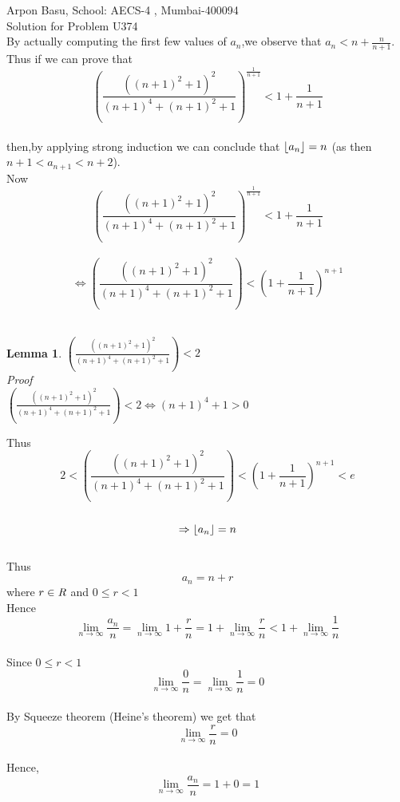 \documentclass[10pt,a4paper]{extarticle}
\DeclarePairedDelimiter\floor{\lfloor}{\rfloor}
\newtheorem{lemma}[theorem]{Lemma}
\begin{document}
Arpon Basu, School: AECS-4 , Mumbai-400094\\
%
Solution for Problem U374 \\
%
By actually computing the first few values of $a_{n}$,we observe that $a_{n}<n+\frac{n}{n+1}$.\\
Thus if we can prove that \\
$$(\frac{((n+1)^{2}+1)^{2}}{(n+1)^{4}+(n+1)^{2}+1})^{\frac{1}{n+1}}<1+\frac{1}{n+1}$$\\
then,by applying strong induction we can conclude that $\floor*{a_{n}}=n$ (as then $n+1<a_{n+1}<n+2$).\\
Now \\
$$(\frac{((n+1)^{2}+1)^{2}}{(n+1)^{4}+(n+1)^{2}+1})^{\frac{1}{n+1}}<1+\frac{1}{n+1}$$\\
$$\Leftrightarrow (\frac{((n+1)^{2}+1)^{2}}{(n+1)^{4}+(n+1)^{2}+1})<(1+\frac{1}{n+1})^{n+1} $$\\



\begin{lemma}

$(\frac{((n+1)^{2}+1)^{2}}{(n+1)^{4}+(n+1)^{2}+1})<2$\\
Proof\\
$(\frac{((n+1)^{2}+1)^{2}}{(n+1)^{4}+(n+1)^{2}+1})<2 \Leftrightarrow (n+1)^{4}+1>0$
\end{lemma}
Thus \\
$$2<(\frac{((n+1)^{2}+1)^{2}}{(n+1)^{4}+(n+1)^{2}+1})<(1+\frac{1}{n+1})^{n+1}<e$$\\
$$\Rightarrow \floor*{a_{n}}=n$$\\
Thus\\
$$a_{n}=n+r$$ where $r\in\emph{R}$ and $0\leq r<1$\\
Hence $$\lim_{n\to\infty}{\frac{a_{n}}{n}}=\lim_{n\to\infty}{1+\frac{r}{n}}=1+\lim_{n\to\infty}{\frac{r}{n}}<1+\lim_{n\rightarrow\infty}{\frac{1}{n}}$$\\
Since $0\leq r<1$ \\ $$\lim_{n\rightarrow\infty}{\frac{0}{n}}=\lim_{n\to\infty}{\frac{1}{n}}=0$$\\
By Squeeze theorem (Heine's theorem) we get that $$\lim_{n\to\infty}{\frac{r}{n}}=0$$\\
Hence,$$\lim_{n\to\infty} \frac{a_{n}}{n}=1+0=1$$ 

 
\end{document}
